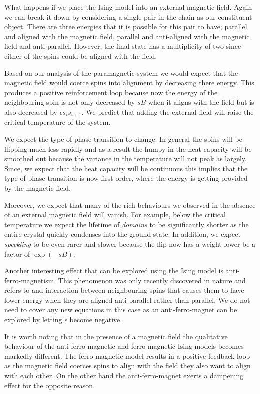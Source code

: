 \documentclass[a4paper, twocolumn]{article}
\begin{document}
What happens if we place the Ising model into an external magnetic %
field. Again we can break it down by considering a single pair %
in the chain as our constituent object. There are three energies %
that it is possible for this pair to have; parallel and aligned %
with the magnetic field, parallel and anti-aligned with the %
magnetic field and anti-parallel. However, the final state has a %
multiplicity of two since either of the spins could be aligned %
with the field. 


Based on our analysis of the paramagnetic system we would expect %
that the magnetic field would coerce spins into alignment by %
decreasing there energy. This produces a positive reinforcement %
loop because now the energy of the neighbouring spin is not %
only decreased by \(sB\) when it aligns with the field but is %
also decreased by \(\epsilon s_{i}s_{i + 1}\). We predict that %
adding the external field will raise the critical temperature of %
the system. 


We expect the type of phase transition to change. In %
general the spins will be flipping much less rapidly and as %
a result the humpy in the heat capacity will be smoothed out %
because the variance in the temperature will not peak as %
largely. Since, we expect that the heat capacity will be %
continuous this implies that the type of phase transition %
is now first order, where the energy is getting provided by the %
magnetic field. 


Moreover, we expect that many of the rich behaviours we observed %
in the absence of an external magnetic field will vanish. For %
example, below the critical temperature we expect the lifetime %
of \emph{domains} to be significantly shorter as the entire %
crystal quickly condenses into the ground state. In addition, %
we expect \emph{speckling} to be even rarer and slower because %
the flip now has a weight lower be a factor of \(\exp(-sB)\). 


Another interesting effect that can be explored using the Ising model %
is anti-ferro-magnetism. This phenomenon was only recently discovered %
in nature and refers to and interaction between neighbouring %
spins that causes them to have lower energy when they are aligned %
anti-parallel rather than parallel. We do not need to cover any new %
equations in this case as an anti-ferro-magnet can be explored by %
letting \(\epsilon\) become negative. 


It is worth noting that in the presence of a magnetic field the %
qualitative behaviour of the anti-ferro-magnetic and ferro-magnetic %
Ising models becomes markedly different. The ferro-magnetic model %
results in a positive feedback loop as the magnetic field coerces %
spins to align with the field they also want to align with each other.
On the other hand the anti-ferro-magnet exerts a dampening effect %
for the opposite reason. 
\end{document}
